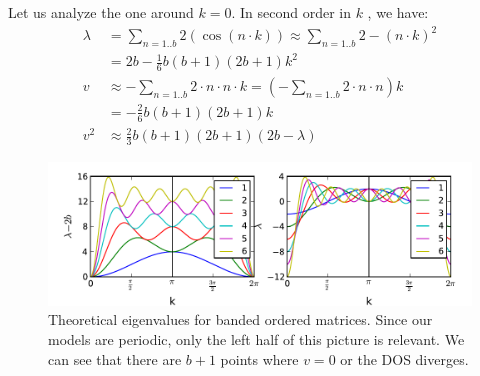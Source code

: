 \documentclass[onecolumn,fleqn,longbibliography]{revtex4}
\begin{document}
Let us analyze the one around $k=0$. 
In second order in $k$ , we have:
\begin{align}
\lambda &= \sum_{n=1..b} 2(\cos(n\cdot k)) \approx \sum_{n=1..b} 2-(n\cdot k)^2 \\
&=2b-\frac{1}{6} b(b+1)(2b+1) k^2\\
v\ \ &\approx -\sum_{n=1..b} 2\cdot n\cdot n \cdot k = \left(-\sum_{n=1..b} 2\cdot n\cdot n \right) k \\
&=-\frac{2}{6} b(b+1)(2b+1) k \\
v^2 &\approx \frac{2}{3}b(b+1)(2b+1)  (2b-\lambda)
\end{align}

\begin{figure}[H]
\includegraphics{pta_theor_banded_ev}
\caption{Theoretical eigenvalues for banded ordered matrices. Since our 
models are periodic, only the left half of this picture is relevant.
We can see that there are $b+1$ points where $v=0$ or the DOS diverges.
}\label{fig:theor_banded_ev}
\end{figure}
\end{document}
